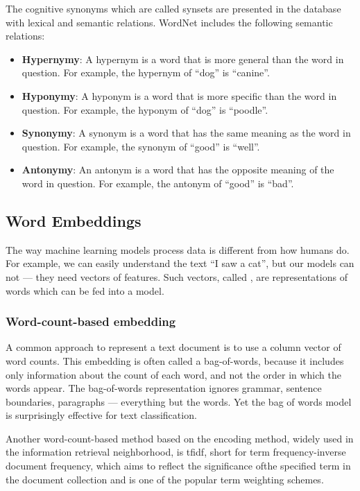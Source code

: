 The cognitive synonyms which are called synsets are presented in the database with lexical and semantic relations. 
WordNet includes the following semantic relations:
\begin{itemize}
    \item \textbf{Hypernymy}: A hypernym is a word that is more general than the word in question. For example, the hypernym of “dog” is “canine”.
    \item \textbf{Hyponymy}: A hyponym is a word that is more specific than the word in question. For example, the hyponym of “dog” is “poodle”.
    \item \textbf{Synonymy}: A synonym is a word that has the same meaning as the word in question. For example, the synonym of “good” is “well”.
    \item \textbf{Antonymy}: An antonym is a word that has the opposite meaning of the word in question. For example, the antonym of “good” is “bad”.
\end{itemize}


\subsection{Word Embeddings}\label{subsec:word-embeddings}
The way machine learning models process data is different from how humans do. 
For example, we can easily understand the text “I saw a cat”, but our models can not --- they need vectors of features. 
Such vectors, called , are representations of words which can be fed into a model.


\subsubsection{Word-count-based embedding}\label{subsubsec:bag-of-words}
A common approach to represent a text document is to use a column vector of word counts.
This embedding is often called a \gls{bag-of-words}, because it includes only information about the count of each word, and not the order in which the words appear.
The bag-of-words representation ignores grammar, sentence boundaries, paragraphs — everything but the words. Yet the bag of words model is surprisingly effective for text classification.

Another word-count-based method based on the encoding method, widely used in the information retrieval neighborhood, is \acrshort{tfidf}, short for term frequency-inverse document frequency, which aims to reflect the significance ofthe specified term in the document collection and is one of the popular term weighting schemes.

